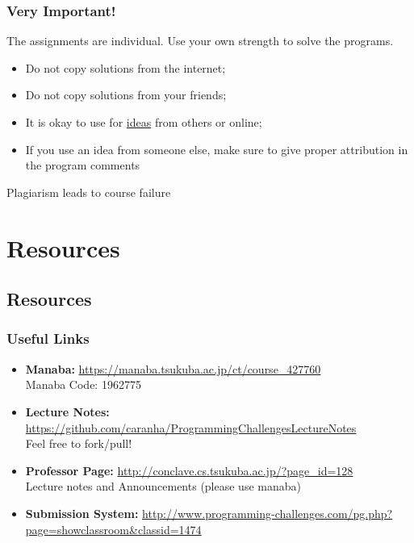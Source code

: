 \documentclass{beamer}
\begin{document}
\begin{frame}
  \frametitle{Very Important!}
  
  The assignments are \alert{individual}. Use your own strength to solve the programs.

  \medskip
  
  \begin{itemize}
  \item Do not copy solutions from the internet;
  \item Do not copy solutions from your friends;
  
  \medskip
  
  \item It is okay to use for \underline{ideas} from others or online;
  \item If you use an idea from someone else, \alert{make sure to give proper attribution} in the program comments
  \end{itemize}
  
  \begin{block}{}
    Plagiarism leads to course failure
  \end{block}
\end{frame}

\section{Resources}
\subsection{Resources}

\begin{frame}
    \frametitle{Useful Links}
    \begin{itemize}
        \item {\bf Manaba: } 
        {\smaller \url{https://manaba.tsukuba.ac.jp/ct/course_427760}}\\
        Manaba Code: 1962775

        \item {\bf Lecture Notes: } 
        {\smaller \url{https://github.com/caranha/ProgrammingChallengesLectureNotes}}\\
        Feel free to fork/pull!
        
        \item {\bf Professor Page: } 
        {\smaller \url{http://conclave.cs.tsukuba.ac.jp/?page_id=128}}\\
        Lecture notes and Announcements (please use manaba)
        
        \item {\bf Submission System: } 
        {\smaller \url{http://www.programming-challenges.com/pg.php?page=showclassroom&classid=1474}}
    \end{itemize}
\end{frame}
\end{document}
